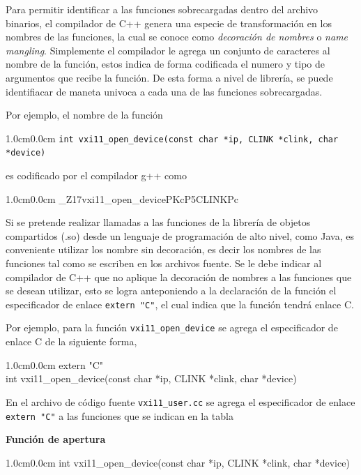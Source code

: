 \documentclass[paper=letter,oneside,fontsize=11pt, parskip=full]{scrartcl}
\newenvironment{code}
	{\begin{adjustwidth}{1.0cm}{0.0cm}\ttfamily}
	{\end{adjustwidth}}
\begin{document}
	Para permitir identificar a las funciones sobrecargadas dentro del archivo binarios, el compilador de C++ genera una especie de transformación en los nombres de las funciones, la cual se conoce como \emph{decoración de nombres} o \emph{name mangling}. Simplemente el compilador le agrega un conjunto de caracteres al nombre de la función, estos indica de forma codificada el numero y tipo de argumentos que recibe la función. De esta forma a nivel de librería, se puede identifiacar de maneta univoca a cada una de las funciones sobrecargadas.
	
	Por ejemplo, el nombre de la función 
	
	\begin{code}
		\texttt{int vxi11\_open\_device(const char *ip, CLINK *clink, char *device) } 
	\end{code}
	
	es codificado por el compilador g++ como 
	
	\begin{code}
		\_Z17vxi11\_open\_devicePKcP5CLINKPc		
	\end{code}

	Si se pretende realizar llamadas a las funciones de la librería de objetos compartidos (.so) desde un lenguaje de programación de alto nivel, como Java, es conveniente utilizar los nombre sin decoración, es decir los nombres de las funciones tal como se escriben en los archivos fuente. Se le debe indicar al compilador de C++ que no aplique la decoración de nombres a las funciones que se desean utilizar, esto se logra anteponiendo a la declaración de la función el especificador de enlace \texttt{extern~"C"}, el cual indica que la función tendrá enlace C.
	
	Por ejemplo, para la función \texttt{vxi11\_open\_device} se agrega el especificador de enlace C de la siguiente forma,
	
	\begin{code}
		\ttfamily
		extern "C" \\
		int vxi11\_open\_device(const char *ip, CLINK *clink, char *device) 
	\end{code}

	En el archivo de código fuente \texttt{vxi11\_user.cc} se agrega el especificador de enlace \texttt{extern "C"} a las funciones que se indican en la tabla 

	\textbf{Función de apertura}
	\begin{code}
		int	vxi11\_open\_device(const char *ip, CLINK *clink, char *device) 
	\end{code}
\end{document}
